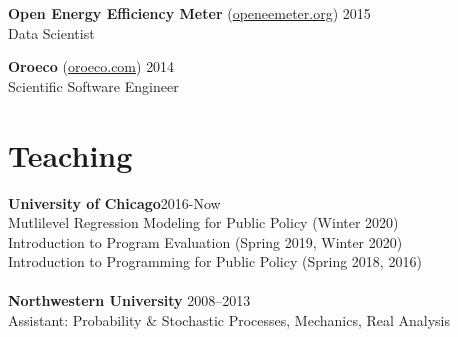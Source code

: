 \documentclass[margin,line]{resume}
\begin{document}
\begin{resume}
	{\bf Open Energy Efficiency Meter} (\href{http://www.openeemeter.org/}{openeemeter.org}) \hfill {2015} \\
	Data Scientist

	{\bf Oroeco} (\href{http://www.oroeco.com}{oroeco.com}) \hfill {2014} \\
	Scientific Software Engineer %
        \section{\mysidestyle Teaching}
        {\bf University of Chicago}\hfill{2016-Now}\\
        Mutlilevel Regression Modeling for Public Policy (Winter 2020)\\
        Introduction to Program Evaluation (Spring 2019, Winter 2020)\\Introduction to Programming for Public Policy (Spring 2018, 2016)\\\\
	{\bf Northwestern University} \hfill {2008--2013}\\
	Assistant: Probability \& Stochastic Processes, Mechanics, Real Analysis%
	

\end{resume}
\end{document}
